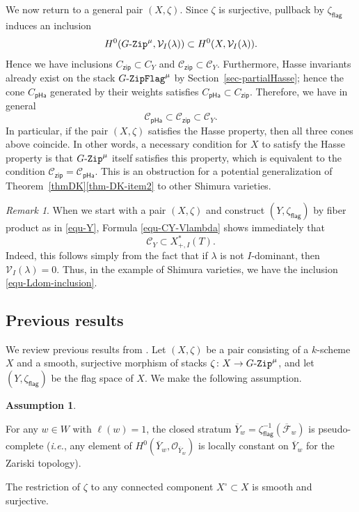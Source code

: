 \documentclass[11pt]{amsart}
\numberwithin{equation}{section}
\theoremstyle{definition}
\newtheorem{assumption}[theorem]{Assumption}
\theoremstyle{remark}
\newtheorem{rmk}[theorem]{Remark}
\newcommand{\GZip}{\mathop{\text{$G$-{\tt Zip}}}\nolimits}
\newcommand{\pha}{\mathsf{pHa}}
\newcommand{\zipsf}{\mathsf{zip}}
\newcommand{\flag}{\mathsf{flag}}
\newcommand{\GF}{\mathop{\text{$G$-{\tt ZipFlag}}}\nolimits}
\newcommand{\Ccal}{{\mathcal C}}
\newcommand{\Fcal}{{\mathcal F}}
\newcommand{\Ocal}{{\mathcal O}}
\newcommand{\Vcal}{{\mathcal V}}
\begin{document}
We now return to a general pair $(X,\zeta)$. Since $\zeta$ is surjective, pullback by $\zeta_{\flag}$ induces an inclusion
\begin{equation}
    H^0(\GZip^\mu,\Vcal_I(\lambda)) \subset H^0(X,\Vcal_I(\lambda)).
\end{equation}
Hence we have inclusions $C_{\zipsf}\subset C_Y$ and $\Ccal_{\zipsf}\subset \Ccal_Y$. Furthermore, Hasse invariants already exist on the stack $\GF^{\mu}$ by Section~\ref{sec-partialHasse}; hence the cone $C_{\pha}$ generated by their weights satisfies $C_{\pha}\subset C_{\zipsf}$. Therefore, we have in general
\begin{equation}
\Ccal_{\pha}\subset \Ccal_{\zipsf}\subset \Ccal_Y.    
\end{equation}
In particular, if the pair $(X,\zeta)$ satisfies the Hasse property, then all three cones above coincide. In other words, a necessary condition for $X$ to satisfy the Hasse property is that $\GZip^{\mu}$ itself satisfies this property, which is equivalent to the condition $\Ccal_{\zipsf}=\Ccal_{\pha}$. This is an obstruction for a potential generalization of Theorem~\ref{thmDK}\eqref{thm-DK-item2} to other Shimura varieties.

\begin{rmk}
When we start with a pair $(X,\zeta)$ and construct $(Y,\zeta_{\flag})$ by fiber product as in \eqref{equ-Y}, Formula \eqref{equ-CY-Vlambda} shows  immediately that 
\begin{equation}\label{equ-Ldom-inclusion}
\Ccal_Y\subset X^*_{+,I}(T).
\end{equation}
Indeed, this follows simply from the fact that if $\lambda$ is not $I$-dominant, then $\Vcal_I(\lambda)=0$. Thus, in the example of Shimura varieties, we have the inclusion \eqref{equ-Ldom-inclusion}.
\end{rmk}


\subsection{Previous results}
We review previous results from \cite{Goldring-Koskivirta-global-sections-compositio}. Let $(X,\zeta)$ be a pair consisting of a $k$-scheme $X$ and a smooth, surjective morphism of stacks $\zeta\colon X\to \GZip^\mu$, and let $(Y,\zeta_{\flag})$ be the flag space of $X$. We make the following assumption. 

\begin{assumption}\label{assume} \leavevmode
\begin{Alist}
\item\label{assume-A} For any $w\in W$ with $\ell(w)=1$, the closed stratum $\overline{Y}_w=\zeta_{\flag}^{-1}(\overline{\Fcal}_w)$ is pseudo-complete (\textit{i.e.}, any element of $H^0(\overline{Y}_w,\Ocal_{\overline{Y}_w})$ is locally constant on $\overline{Y}_w$ for the Zariski topology).
\item\label{assume-B} The restriction of $\zeta$ to any connected component $X^\circ \subset X$ is smooth and surjective.
\end{Alist}
\end{assumption}
\end{document}
